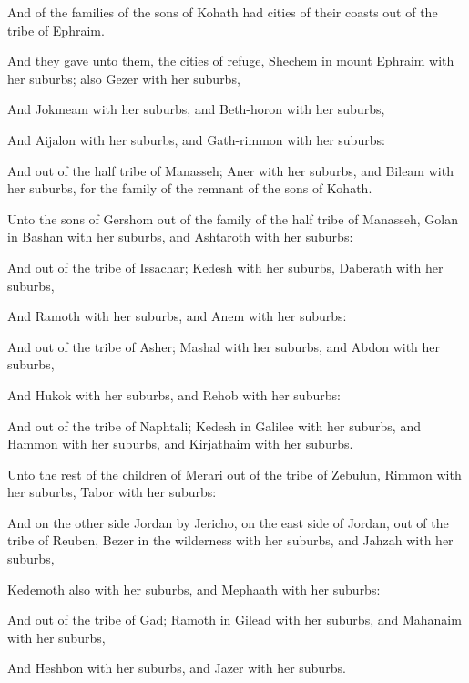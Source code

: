 {And
{} of the
families of the
sons of
Kohath had
cities of their
coasts out of the
tribe of
Ephraim.

And they
gave unto them,
{} the
cities of
refuge,
Shechem in
mount
Ephraim with her
suburbs;
{} also
Gezer with her
suburbs,

And
Jokmeam with her
suburbs, and
Beth-horon with her
suburbs,

And
Aijalon with her
suburbs, and
Gath-rimmon with her
suburbs:

And out of the
half
tribe of
Manasseh;
Aner with her
suburbs, and
Bileam with her
suburbs, for the
family of the
remnant of the
sons of
Kohath.

Unto the
sons of
Gershom
{} out of the
family of the
half
tribe of
Manasseh,
Golan in
Bashan with her
suburbs, and
Ashtaroth with her
suburbs:

And out of the
tribe of
Issachar;
Kedesh with her
suburbs,
Daberath with her
suburbs,

And
Ramoth with her
suburbs, and
Anem with her
suburbs:

And out of the
tribe of
Asher;
Mashal with her
suburbs, and
Abdon with her
suburbs,

And
Hukok with her
suburbs, and
Rehob with her
suburbs:

And out of the
tribe of
Naphtali;
Kedesh in
Galilee with her
suburbs, and
Hammon with her
suburbs, and
Kirjathaim with her
suburbs.

Unto the
rest of the
children of
Merari
{} out of the
tribe of
Zebulun,
Rimmon with her
suburbs,
Tabor with her
suburbs:

And on the other
side
Jordan by
Jericho, on the east
side of
Jordan,
{} out of the
tribe of
Reuben,
Bezer in the
wilderness with her
suburbs, and
Jahzah with her
suburbs,

Kedemoth also with her
suburbs, and
Mephaath with her
suburbs:

And out of the
tribe of
Gad;
Ramoth in
Gilead with her
suburbs, and
Mahanaim with her
suburbs,

And
Heshbon with her
suburbs, and
Jazer with her
suburbs.




\par }
